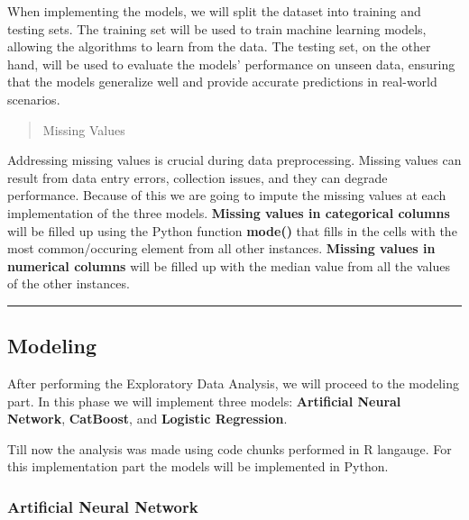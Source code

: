 \documentclass[
  letterpaper,
  DIV=11,
  numbers=noendperiod]{scrartcl}
\begin{document}
When implementing the models, we will split the dataset into training
and testing sets. The training set will be used to train machine
learning models, allowing the algorithms to learn from the data. The
testing set, on the other hand, will be used to evaluate the models'
performance on unseen data, ensuring that the models generalize well and
provide accurate predictions in real-world scenarios.

\begin{quote}
Missing Values
\end{quote}

Addressing missing values is crucial during data preprocessing. Missing
values can result from data entry errors, collection issues, and they
can degrade performance. Because of this we are going to impute the
missing values at each implementation of the three models.
\textbf{Missing values in categorical columns} will be filled up using
the Python function \textbf{mode()} that fills in the cells with the
most common/occuring element from all other instances. \textbf{Missing
values in numerical columns} will be filled up with the median value
from all the values of the other instances.

\begin{center}\rule{0.5\linewidth}{0.5pt}\end{center}

\hypertarget{modeling}{%
\subsection{Modeling}\label{modeling}}

After performing the Exploratory Data Analysis, we will proceed to the
modeling part. In this phase we will implement three models:
\textbf{Artificial Neural Network}, \textbf{CatBoost}, and
\textbf{Logistic Regression}.

Till now the analysis was made using code chunks performed in R
langauge. For this implementation part the models will be implemented in
Python.

\hypertarget{artificial-neural-network}{%
\subsubsection{Artificial Neural
Network}\label{artificial-neural-network}}
\end{document}
